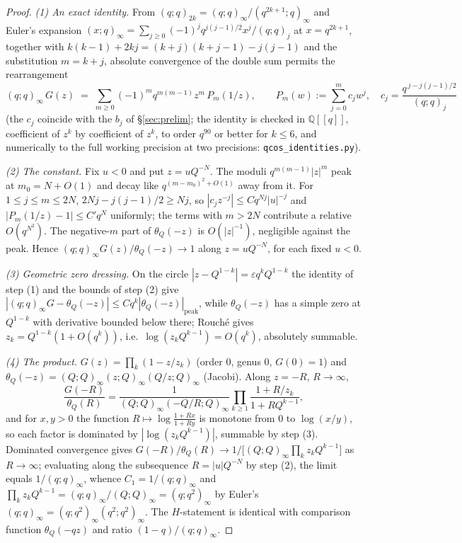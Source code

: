 \documentclass[11pt]{article}
\theoremstyle{plain}
\theoremstyle{definition}
\theoremstyle{remark}
\newcommand{\Q}{\mathbb{Q}}
\begin{document}
\begin{proof}
\emph{(1) An exact identity.} From $(q;q)_{2k}=(q;q)_\infty/(q^{2k+1};q)_\infty$ and Euler's
expansion $(x;q)_\infty=\sum_{j\ge0}(-1)^jq^{j(j-1)/2}x^j/(q;q)_j$ \cite[(1.3.16)]{GR} at
$x=q^{2k+1}$, together with
$k(k-1)+2kj=(k+j)(k+j-1)-j(j-1)$ and the substitution $m=k+j$, absolute convergence of the double
sum permits the rearrangement
\[
   (q;q)_\infty\,G(z)\;=\;\sum_{m\ge0}(-1)^mq^{m(m-1)}z^m\,P_m(1/z),
   \qquad
   P_m(w):=\sum_{j=0}^m c_jw^j,\quad c_j=\frac{q^{\,j-j(j-1)/2}}{(q;q)_j}
\]
(the $c_j$ coincide with the $b_j$ of \S\ref{sec:prelim}; the identity is checked in
$\Q[[q]]$, coefficient of $z^k$ by coefficient of $z^k$, to order $q^{90}$ or better for $k\le6$,
and numerically to the full working precision at two precisions:
\texttt{qcos\_identities.py}).

\emph{(2) The constant.} Fix $u<0$ and put $z=uQ^{-N}$. The moduli $q^{m(m-1)}|z|^m$ peak at
$m_0=N+O(1)$ and decay like $q^{(m-m_0)^2+O(1)}$ away from it. For $1\le j\le m\le 2N$,
$2Nj-j(j-1)/2\ge Nj$, so $|c_jz^{-j}|\le Cq^{Nj}|u|^{-j}$ and
$|P_m(1/z)-1|\le C'q^{N}$ uniformly; the terms with $m>2N$ contribute a relative
$O(q^{N^2})$. The negative-$m$ part of $\theta_Q(-z)$ is $O(|z|^{-1})$, negligible against the peak.
Hence $(q;q)_\infty G(z)/\theta_Q(-z)\to1$ along $z=uQ^{-N}$, for each fixed $u<0$.

\emph{(3) Geometric zero dressing.} On the circle $|z-Q^{1-k}|=\varepsilon q^kQ^{1-k}$ the identity
of step (1) and the bounds of step (2) give
$|(q;q)_\infty G-\theta_Q(-z)|\le Cq^k|\theta_Q(-z)|_{\text{peak}}$, while $\theta_Q(-z)$ has a
simple zero at $Q^{1-k}$ with derivative bounded below there; Rouch\'e gives
$z_k=Q^{1-k}(1+O(q^k))$, i.e.\ $\log(z_kQ^{k-1})=O(q^k)$, absolutely summable.

\emph{(4) The product.} $G(z)=\prod_k(1-z/z_k)$ (order $0$, genus $0$, $G(0)=1$) and
$\theta_Q(-z)=(Q;Q)_\infty(z;Q)_\infty(Q/z;Q)_\infty$ (Jacobi). Along $z=-R$, $R\to\infty$,
\[
   \frac{G(-R)}{\theta_Q(R)}
   =\frac1{(Q;Q)_\infty(-Q/R;Q)_\infty}\prod_{k\ge1}\frac{1+R/z_k}{1+RQ^{k-1}} ,
\]
and for $x,y>0$ the function $R\mapsto\log\frac{1+Rx}{1+Ry}$ is monotone from $0$ to $\log(x/y)$, so
each factor is dominated by $|\log(z_kQ^{k-1})|$, summable by step (3). Dominated convergence gives
$G(-R)/\theta_Q(R)\to1/\bigl[(Q;Q)_\infty\prod_kz_kQ^{k-1}\bigr]$ as $R\to\infty$; evaluating along
the subsequence $R=|u|Q^{-N}$ by step (2), the limit equals $1/(q;q)_\infty$, whence
$C_1=1/(q;q)_\infty$ and $\prod_kz_kQ^{k-1}=(q;q)_\infty/(Q;Q)_\infty=(q;q^2)_\infty$ by Euler's
$(q;q)_\infty=(q;q^2)_\infty(q^2;q^2)_\infty$. The $H$-statement is identical with comparison
function $\theta_Q(-qz)$ and ratio $(1-q)/(q;q)_\infty$.
\end{proof}
\end{document}
